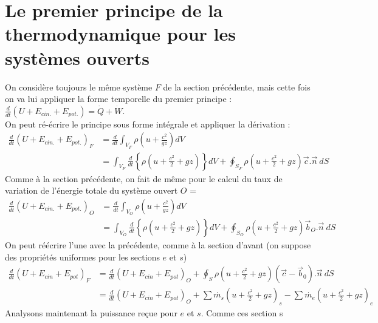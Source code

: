 \section{Le premier principe de la thermodynamique pour les systèmes 
ouverts}
On considère toujours le même système $F$ de la section précédente, mais 
cette fois on va lui appliquer la forme temporelle du premier principe :
$\frac{d}{dt}\left(U + E_{cin.} + E_{pot.}\right) = \dot{Q}+\dot{W}$. \\
On peut ré-écrire le principe sous forme intégrale et appliquer la 
dérivation :
\begin{equation}
\begin{array}{ll}
\displaystyle\frac{d}{dt}\left(U + E_{cin.} + E_{pot.}\right)_F &=\displaystyle
 \frac{d}{dt}\int_{V_F} \rho\left(u+\frac{c^2}{gz}\right)dV\\
&\displaystyle = \int_{V_F}\frac{d}{dt}\left\{\rho
\left(u+\frac{c^2}{2}+gz\right)\right\}dV + \oint_{S_F}\rho\left(u+\frac{
c^2}{2}+gz\right)\vec{c}.\vec{n}\ dS
\end{array}
\end{equation}
Comme à la section précédente, on fait de même pour le calcul du taux 
de variation de l'énergie totale du système ouvert $O$ = 
\begin{equation}
\begin{array}{ll}
\displaystyle\frac{d}{dt}\left(U + E_{cin.} + E_{pot.}\right)_O &=\displaystyle
 \frac{d}{dt}\int_{V_O} \rho\left(u+\frac{c^2}{gz}\right)dV\\
&\displaystyle = \int_{V_O}\frac{d}{dt}\left\{\rho
\left(u+\frac{c^2}{2}+gz\right)\right\}dV + \oint_{S_O}\rho\left(u+\frac{
c^2}{2}+gz\right)\vec{b}_O.\vec{n}\ dS
\end{array}
\end{equation}
On peut réécrire l'une avec la précédente, comme à la section d'avant (on 
suppose des propriétés uniformes pour les sections $e$ et $s$)
\begin{equation}
\begin{array}{ll}
\frac{d}{dt}\left(U+E_{cin}+E_{pot}\right)_F &= \frac{d}{dt}\left(U+E_{cin}+
E_{pot}\right)_O + \oint_S\rho\left(u+\frac{c^2}{2}+gz\right)(\vec{c}-\vec{b}_0)
.\vec{n}\ dS\\
&= \frac{d}{dt}\left(U+E_{cin}+E_{pot}\right)_O + \sum \dot{m_s}\left(
u+\frac{c^2}{2}+gz\right)_s -\sum \dot{m_e}\left(u+\frac{c^2}{2}+gz\right)_e
\end{array}
\end{equation}
Analysons maintenant la puissance reçue pour $e$ et $s$. Comme ces section s
